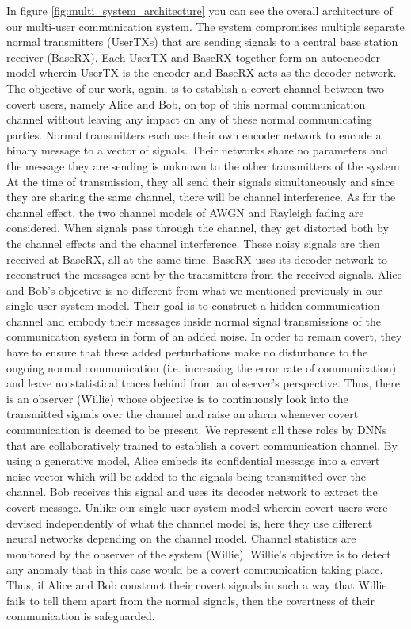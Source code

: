In figure \ref{fig:multi_system_architecture} you can see the overall architecture of our multi-user communication system. The system compromises multiple separate normal transmitters (UserTXs) that are sending signals to a central base station receiver (BaseRX). Each UserTX and BaseRX together form an autoencoder model wherein UserTX is the encoder and BaseRX acts as the decoder network. The objective of our work, again, is to establish a covert channel between two covert users, namely Alice and Bob, on top of this normal communication channel without leaving any impact on any of these normal communicating parties. Normal transmitters each use their own encoder network to encode a binary message to a vector of signals. Their networks share no parameters and the message they are sending is unknown to the other transmitters of the system. At the time of transmission, they all send their signals simultaneously and since they are sharing the same channel, there will be channel interference. As for the channel effect, the two channel models of AWGN and Rayleigh fading are considered. When signals pass through the channel, they get distorted both by the channel effects and the channel interference. These noisy signals are then received at BaseRX, all at the same time. BaseRX uses its decoder network to reconstruct the messages sent by the transmitters from the received signals. Alice and Bob's objective is no different from what we mentioned previously in our single-user system model. Their goal is to construct a hidden communication channel and embody their messages inside normal signal transmissions of the communication system in form of an added noise. In order to remain covert, they have to ensure that these added perturbations make no disturbance to the ongoing normal communication (i.e. increasing the error rate of communication) and leave no statistical traces behind from an observer's perspective. Thus, there is an observer (Willie) whose objective is to continuously look into the transmitted signals over the channel and raise an alarm whenever covert communication is deemed to be present. We represent all these roles by DNNs that are collaboratively trained to establish a covert communication channel. By using a generative model, Alice embeds its confidential message into a covert noise vector which will be added to the signals being transmitted over the channel. Bob receives this signal and uses its decoder network to extract the covert message. Unlike our single-user system model wherein covert users were devised independently of what the channel model is, here they use different neural networks depending on the channel model. Channel statistics are monitored by the observer of the system (Willie). Willie's objective is to detect any anomaly that in this case would be a covert communication taking place. Thus, if Alice and Bob construct their covert signals in such a way that Willie fails to tell them apart from the normal signals, then the covertness of their communication is safeguarded.

